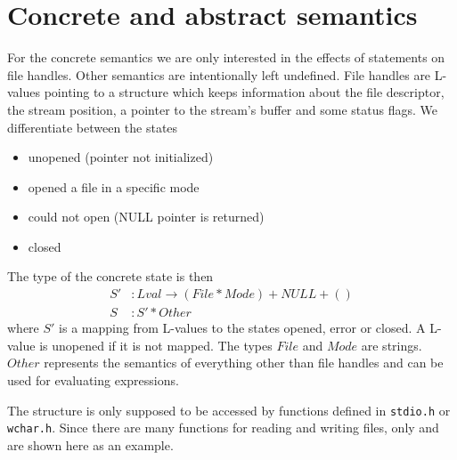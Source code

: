 \section{Concrete and abstract semantics}
For the concrete semantics we are only interested in the effects of statements on file handles. Other semantics are intentionally left undefined.
File handles are L-values pointing to a structure  which keeps information about the file descriptor, the stream position, a pointer to the stream's buffer and some status flags.
We differentiate between the states
\begin{itemize}
\item unopened (pointer not initialized)
\item opened a file in a specific mode
\item could not open (NULL pointer is returned)
\item closed
\end{itemize}
The type of the concrete state is then %
\begin{align}
S' &: \mathit{Lval} \to (\mathit{File} * \mathit{Mode}) + \mathit{NULL} + ()\\
S  &: S' * \mathit{Other}
\end{align}
where $S'$ is a mapping from L-values to the states opened, error or closed. A L-value is unopened if it is not mapped.
The types $\mathit{File}$ and $\mathit{Mode}$ are strings.
$\mathit{Other}$ represents the semantics of everything other than file handles and can be used for evaluating expressions.

The  structure is only supposed to be accessed by functions defined in \verb|stdio.h| or \verb|wchar.h|.
Since there are many functions for reading and writing files, only  and  are shown here as an example.

%


